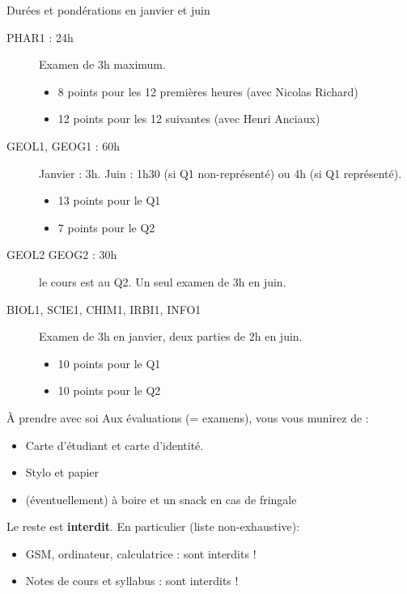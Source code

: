 \documentclass[french,xcolor=svgnames]{beamer}
\begin{document}
\begin{frame}{Durées et pondérations en janvier et juin}\pause{}
  \begin{description}
  \item [PHAR1 : 24h] Examen de 3h maximum.
    \begin{itemize}
    \item 8 points pour les 12 premières heures (avec Nicolas Richard)
    \item 12 points pour les 12 suivantes (avec Henri Anciaux)
    \end{itemize}\pause{}

  \item[GEOL1, GEOG1 : 60h] Janvier : 3h. Juin : 1h30 (si Q1 non-représenté) ou 4h (si Q1 représenté).
    \begin{itemize}
    \item 13 points pour le Q1
    \item 7 points pour le Q2
    \end{itemize}\pause{}
  \item[GEOL2 GEOG2 : 30h] le cours est au Q2. Un seul examen de 3h en juin.\pause{}
  \item[BIOL1, SCIE1, CHIM1, IRBI1, INFO1] Examen de 3h en janvier, deux parties de 2h en juin.%
    \begin{itemize}
    \item 10 points pour le Q1
    \item 10 points pour le Q2
    \end{itemize}
  \end{description}
\end{frame}
\begin{frame}{À prendre avec soi}
  Aux évaluations (= examens), vous vous munirez de :
  \begin{itemize}
  \item Carte d'étudiant et carte d'identité.
  \item Stylo et papier
  \item (éventuellement) à boire et un snack en cas de fringale
  \end{itemize}
  Le reste est \textbf{interdit}. En particulier (liste non-exhaustive):
  \begin{itemize}
  \item GSM, ordinateur, \alert{calculatrice} : sont interdits !\pause
  \item Notes de cours et syllabus : sont interdits !
  \end{itemize}
\end{frame}
\end{document}
